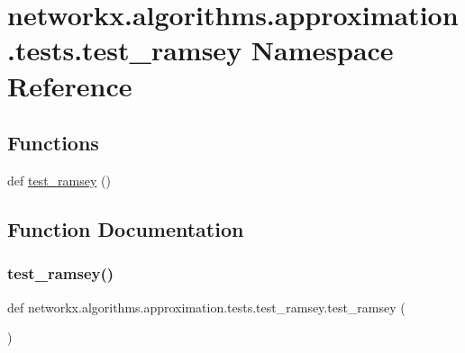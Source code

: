 \hypertarget{namespacenetworkx_1_1algorithms_1_1approximation_1_1tests_1_1test__ramsey}{}\section{networkx.\+algorithms.\+approximation.\+tests.\+test\+\_\+ramsey Namespace Reference}
\label{namespacenetworkx_1_1algorithms_1_1approximation_1_1tests_1_1test__ramsey}
\subsection*{Functions}
\begin{DoxyCompactItemize}
\item 
def \hyperlink{namespacenetworkx_1_1algorithms_1_1approximation_1_1tests_1_1test__ramsey_a720052fcdeb32a7c6c81f56b068a9e7b}{test\+\_\+ramsey} ()
\end{DoxyCompactItemize}


\subsection{Function Documentation}
\mbox{\label{namespacenetworkx_1_1algorithms_1_1approximation_1_1tests_1_1test__ramsey_a720052fcdeb32a7c6c81f56b068a9e7b}} 
\subsubsection{\texorpdfstring{test\+\_\+ramsey()}{test\_ramsey()}}
{\footnotesize\ttfamily def networkx.\+algorithms.\+approximation.\+tests.\+test\+\_\+ramsey.\+test\+\_\+ramsey (\begin{DoxyParamCaption}{ }\end{DoxyParamCaption})}

